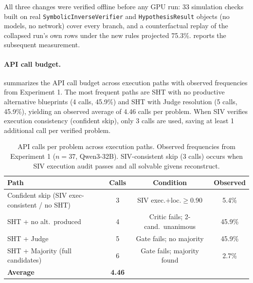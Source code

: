 \documentclass[11pt,a4paper]{article}
\begin{document}
All three changes were verified offline before any GPU run: 33 simulation checks built on real \texttt{SymbolicInverseVerifier} and \texttt{HypothesisResult} objects (no models, no network) cover every branch, and a counterfactual replay of the collapsed run's own rows under the new rules projected 75.3\%.
 reports the subsequent measurement.
\paragraph{API call budget.}
 summarizes the API call budget across execution paths with observed frequencies from Experiment 1.
The most frequent paths are SHT with no productive alternative blueprints (4 calls, 45.9\%) and SHT with Judge resolution (5 calls, 45.9\%), yielding an observed average of 4.46 calls per problem.
When SIV verifies execution consistency (confident skip), only 3 calls are used, saving at least 1 additional call per verified problem.
\begin{table}[h]
\centering
\caption{API calls per problem across execution paths. Observed frequencies from Experiment 1 ($n=37$, Qwen3-32B). SIV-consistent skip (3 calls) occurs when SIV execution audit passes and all solvable givens reconstruct.}
\label{tab:api_calls}
\begin{tabular}{p{5.8cm}ccc}
\toprule
\textbf{Path} & \textbf{Calls} & \textbf{Condition} & \textbf{Observed} \\
\midrule
Confident skip (SIV exec-consistent / no SHT)    & 3 & SIV exec.$+$loc.$\geq$0.90      & 5.4\% \\
SHT + no alt.\ produced           & 4 & Critic fails; 2-cand.\ unanimous      & 45.9\% \\
SHT + Judge                       & 5 & Gate fails; no majority               & 45.9\% \\
SHT + Majority (full candidates)  & 6 & Gate fails; majority found            & 2.7\% \\
\midrule
\textbf{Average} & \textbf{4.46} & & \\
\bottomrule
\end{tabular}
\end{table}
\end{document}
